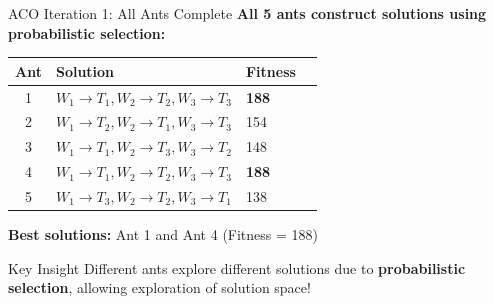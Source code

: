 \documentclass[aspectratio=43,8pt]{beamer}
\begin{document}
\begin{frame}{ACO Iteration 1: All Ants Complete}
\textbf{All 5 ants construct solutions using probabilistic selection:}

\vspace{0.3cm}
\begin{center}
\begin{tabular}{cllc}
\toprule
\textbf{Ant} & \textbf{Solution} & \textbf{Fitness} \\
\midrule
1 & $W_1\to T_1, W_2\to T_2, W_3\to T_3$ & \textcolor{accentgreen}{\textbf{188}} \\
2 & $W_1\to T_2, W_2\to T_1, W_3\to T_3$ & 154 \\
3 & $W_1\to T_1, W_2\to T_3, W_3\to T_2$ & 148 \\
4 & $W_1\to T_1, W_2\to T_2, W_3\to T_3$ & \textcolor{accentgreen}{\textbf{188}} \\
5 & $W_1\to T_3, W_2\to T_2, W_3\to T_1$ & 138 \\
\bottomrule
\end{tabular}
\end{center}

\vspace{0.3cm}
\textbf{Best solutions:} Ant 1 and Ant 4 (Fitness = 188)

\vspace{0.3cm}
\begin{alertblock}{Key Insight}
Different ants explore different solutions due to \textbf{probabilistic selection}, allowing exploration of solution space!
\end{alertblock}
\end{frame}
\end{document}
